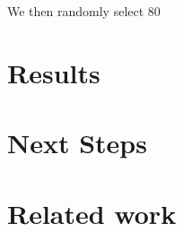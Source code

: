 \documentclass{article} %
\begin{document}
We then randomly select 80%

\section{Results}

\section{Next Steps}


\section{Related work}
\end{document}
